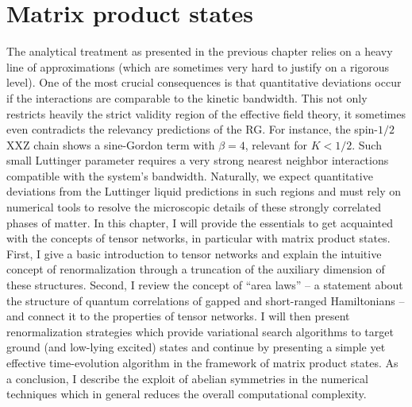 \chapter{Matrix product states}
\label{sec:matrix_product_states}
The analytical treatment as presented in the previous chapter relies on a heavy line of approximations (which are sometimes very hard to justify on a rigorous level).
One of the most crucial consequences is that quantitative deviations occur if the interactions are comparable to the kinetic bandwidth.
This not only restricts heavily the strict validity region of the effective field theory, it sometimes even contradicts the relevancy predictions of the RG.
For instance, the spin-$1/2$ XXZ chain shows a sine-Gordon term with $\beta=4$, relevant for $K<1/2$.
Such small Luttinger parameter requires a very strong nearest neighbor interactions compatible with the system's bandwidth.
Naturally, we expect quantitative deviations from the Luttinger liquid predictions in such regions and must rely on numerical tools to resolve the microscopic details of these strongly correlated phases of matter.
In this chapter, I will provide the essentials to get acquainted with the concepts of tensor networks, in particular with matrix product states.
\\

First, I give a basic introduction to tensor networks and explain the intuitive concept of renormalization through a truncation of the auxiliary dimension of these structures.
Second, I review the concept of ``area laws'' -- a statement about the structure of quantum correlations of gapped and short-ranged Hamiltonians -- and connect it to the properties of tensor networks.
I will then present renormalization strategies which provide variational search algorithms to target ground (and low-lying excited) states and continue by presenting a simple yet effective time-evolution algorithm in the framework of matrix product states.
As a conclusion, I describe the exploit of abelian symmetries in the numerical techniques which in general reduces the overall computational complexity.
%
%
